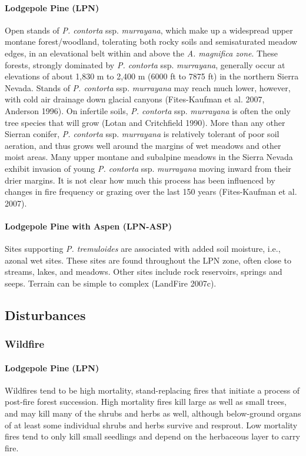 \paragraph{Lodgepole Pine (LPN)}	Open stands of \emph{P. contorta} ssp. \emph{murrayana}, which make up a widespread upper montane forest/woodland, tolerating both rocky soils and semisaturated meadow edges, in an elevational belt within and above the \emph{A. magnifica zone}. These forests, strongly dominated by \emph{P. contorta} ssp. \emph{murrayana}, generally occur at elevations of about 1,830 m to 2,400 m (6000 ft to 7875 ft) in the northern Sierra Nevada. Stands of \emph{P. contorta} ssp. \emph{murrayana} may reach much lower, however, with cold air drainage down glacial canyons (Fites-Kaufman et al. 2007, Anderson 1996). On infertile soils, \emph{P. contorta} ssp. \emph{murrayana} is often the only tree species that will grow (Lotan and Critchfield 1990).
More than any other Sierran conifer, \emph{P. contorta} ssp. \emph{murrayana} is relatively tolerant of poor soil aeration, and thus grows well around the margins of wet meadows and other moist areas. Many upper montane and subalpine meadows in the Sierra Nevada exhibit invasion of young \emph{P. contorta} ssp. \emph{murrayana} moving inward from their drier margins. It is not clear how much this process has been influenced by changes in fire frequency or grazing over the last 150 years (Fites-Kaufman et al. 2007).

\paragraph{Lodgepole Pine with Aspen (LPN-ASP)}		Sites supporting \emph{P. tremuloides} are associated with added soil moisture, i.e., azonal wet sites. These sites are found throughout the LPN zone, often close to streams, lakes, and meadows. Other sites include rock reservoirs, springs and seeps. Terrain can be simple to complex (LandFire 2007c). 


\subsection*{Disturbances}

\subsubsection{Wildfire}

\paragraph{Lodgepole Pine (LPN)} 	Wildfires tend to be high mortality, stand-replacing fires that initiate a process of post-fire forest succession. High mortality fires kill large as well as small trees, and may kill many of the shrubs and herbs as well, although below-ground organs of at least some individual shrubs and herbs survive and resprout. Low mortality fires tend to only kill small seedlings and depend on the herbaceous layer to carry fire.

